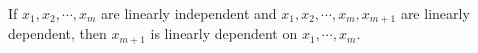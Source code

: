 If $x_1, x_2, \cdots, x_m$ are linearly independent and $x_1, x_2, \cdots, x_m, x_{m+1}$ are linearly dependent, then $x_{m+1}$ is linearly dependent on $x_1, \cdots, x_m$.
